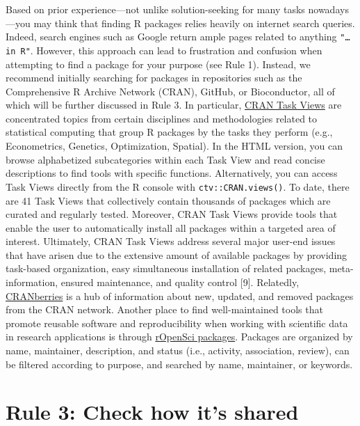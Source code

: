\documentclass[10pt,letterpaper]{article}
\begin{document}
Based on prior experience---not unlike solution-seeking for many tasks
nowadays---you may think that finding R packages relies heavily on
internet search queries. Indeed, search engines such as Google return
ample pages related to anything \texttt{"\ldots{}in\ R"}. However, this
approach can lead to frustration and confusion when attempting to find a
package for your purpose (see Rule 1). Instead, we recommend initially
searching for packages in repositories such as the Comprehensive R
Archive Network (CRAN), GitHub, or Bioconductor, all of which will be
further discussed in Rule 3. In particular,
\href{https://cran.r-project.org/web/views/}{CRAN Task Views} are
concentrated topics from certain disciplines and methodologies related
to statistical computing that group R packages by the tasks they perform
(e.g., Econometrics, Genetics, Optimization, Spatial). In the HTML
version, you can browse alphabetized subcategories within each Task View
and read concise descriptions to find tools with specific functions.
Alternatively, you can access Task Views directly from the R console
with \texttt{ctv::CRAN.views()}. To date, there are 41 Task Views that
collectively contain thousands of packages which are curated and
regularly tested. Moreover, CRAN Task Views provide tools that enable
the user to automatically install all packages within a targeted area of
interest. Ultimately, CRAN Task Views address several major user-end
issues that have arisen due to the extensive amount of available
packages by providing task-based organization, easy simultaneous
installation of related packages, meta-information, ensured maintenance,
and quality control {[}9{]}. Relatedly,
\href{http://dirk.eddelbuettel.com/cranberries/index.html}{CRANberries}
is a hub of information about new, updated, and removed packages from
the CRAN network. Another place to find well-maintained tools that
promote reusable software and reproducibility when working with
scientific data in research applications is through
\href{https://ropensci.org/packages/}{rOpenSci packages}. Packages are
organized by name, maintainer, description, and status (i.e., activity,
association, review), can be filtered according to purpose, and searched
by name, maintainer, or keywords.

\hypertarget{rule-3-check-how-its-shared}{%
\section{Rule 3: Check how it's
shared}\label{rule-3-check-how-its-shared}}
\end{document}
